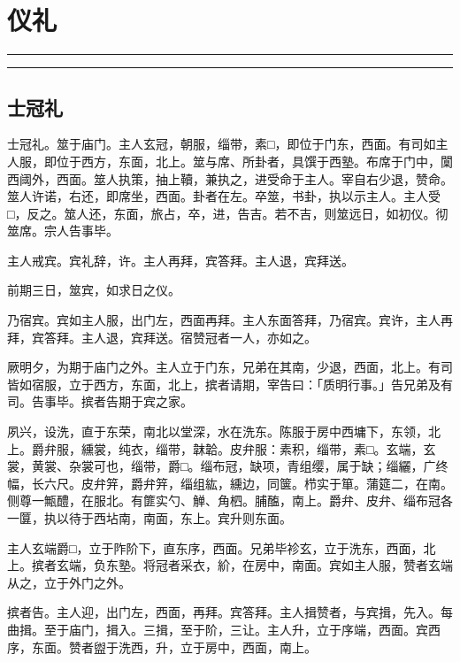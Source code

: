 \documentclass[]{article}
\date{}
\begin{document}
\hypertarget{header-n0}{%
\section{仪礼}\label{header-n0}}

\begin{center}\rule{0.5\linewidth}{\linethickness}\end{center}

\tableofcontents

\begin{center}\rule{0.5\linewidth}{\linethickness}\end{center}

\hypertarget{header-n10}{%
\subsection{士冠礼}\label{header-n10}}

士冠礼。筮于庙门。主人玄冠，朝服，缁带，素□，即位于门东，西面。有司如主人服，即位于西方，东面，北上。筮与席、所卦者，具馔于西塾。布席于门中，闑西阈外，西面。筮人执策，抽上韇，兼执之，进受命于主人。宰自右少退，赞命。筮人许诺，右还，即席坐，西面。卦者在左。卒筮，书卦，执以示主人。主人受□，反之。筮人还，东面，旅占，卒，进，告吉。若不吉，则筮远日，如初仪。彻筮席。宗人告事毕。

主人戒宾。宾礼辞，许。主人再拜，宾答拜。主人退，宾拜送。

前期三日，筮宾，如求日之仪。

乃宿宾。宾如主人服，出门左，西面再拜。主人东面答拜，乃宿宾。宾许，主人再拜，宾答拜。主人退，宾拜送。宿赞冠者一人，亦如之。

厥明夕，为期于庙门之外。主人立于门东，兄弟在其南，少退，西面，北上。有司皆如宿服，立于西方，东面，北上，摈者请期，宰告曰：「质明行事。」告兄弟及有司。告事毕。摈者告期于宾之家。

夙兴，设洗，直于东荣，南北以堂深，水在洗东。陈服于房中西墉下，东领，北上。爵弁服，纁裳，纯衣，缁带，韎韐。皮弁服：素积，缁带，素□。玄端，玄裳，黄裳、杂裳可也，缁带，爵□。缁布冠，缺项，青组缨，属于缺；缁纚，广终幅，长六尺。皮弁笄，爵弁笄，缁组紘，纁边，同箧。栉实于箪。蒲筵二，在南。侧尊一甒醴，在服北。有篚实勺、觯、角柶。脯醢，南上。爵弁、皮弁、缁布冠各一匴，执以待于西坫南，南面，东上。宾升则东面。

主人玄端爵□，立于阼阶下，直东序，西面。兄弟毕袗玄，立于洗东，西面，北上。摈者玄端，负东塾。将冠者采衣，紒，在房中，南面。宾如主人服，赞者玄端从之，立于外门之外。

摈者告。主人迎，出门左，西面，再拜。宾答拜。主人揖赞者，与宾揖，先入。每曲揖。至于庙门，揖入。三揖，至于阶，三让。主人升，立于序端，西面。宾西序，东面。赞者盥于洗西，升，立于房中，西面，南上。
\end{document}
